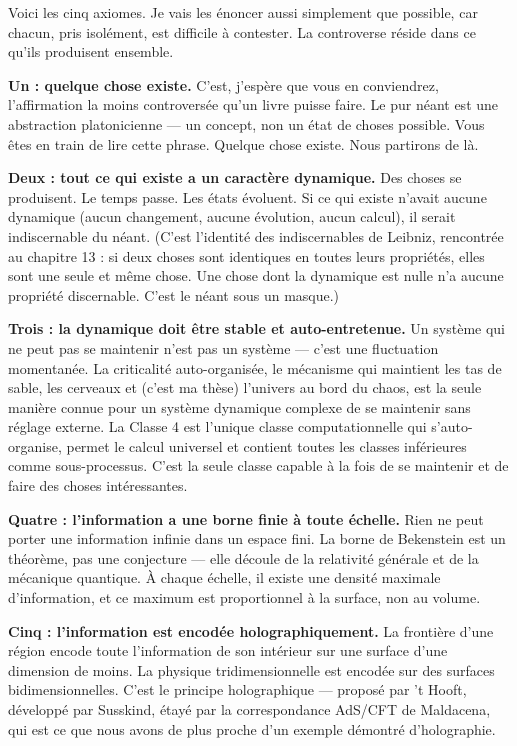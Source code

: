 \documentclass[11pt, twoside, openright]{book}
\begin{document}
Voici les cinq axiomes. Je vais les énoncer aussi simplement que possible, car chacun, pris isolément, est difficile à contester. La controverse réside dans ce qu'ils produisent ensemble.

\textbf{Un : quelque chose existe.} C'est, j'espère que vous en conviendrez, l'affirmation la moins controversée qu'un livre puisse faire. Le pur néant est une abstraction platonicienne --- un concept, non un état de choses possible. Vous êtes en train de lire cette phrase. Quelque chose existe. Nous partirons de là.

\textbf{Deux : tout ce qui existe a un caractère dynamique.} Des choses se produisent. Le temps passe. Les états évoluent. Si ce qui existe n'avait aucune dynamique (aucun changement, aucune évolution, aucun calcul), il serait indiscernable du néant. (C'est l'identité des indiscernables de Leibniz, rencontrée au chapitre 13 : si deux choses sont identiques en toutes leurs propriétés, elles sont une seule et même chose. Une chose dont la dynamique est nulle n'a aucune propriété discernable. C'est le néant sous un masque.)

\textbf{Trois : la dynamique doit être stable et auto-entretenue.} Un système qui ne peut pas se maintenir n'est pas un système --- c'est une fluctuation momentanée. La criticalité auto-organisée, le mécanisme qui maintient les tas de sable, les cerveaux et (c'est ma thèse) l'univers au bord du chaos, est la seule manière connue pour un système dynamique complexe de se maintenir sans réglage externe. La Classe 4 est l'unique classe computationnelle qui s'auto-organise, permet le calcul universel et contient toutes les classes inférieures comme sous-processus. C'est la seule classe capable à la fois de se maintenir et de faire des choses intéressantes.

\textbf{Quatre : l'information a une borne finie à toute échelle.} Rien ne peut porter une information infinie dans un espace fini. La borne de Bekenstein est un théorème, pas une conjecture --- elle découle de la relativité générale et de la mécanique quantique. À chaque échelle, il existe une densité maximale d'information, et ce maximum est proportionnel à la surface, non au volume.

\textbf{Cinq : l'information est encodée holographiquement.} La frontière d'une région encode toute l'information de son intérieur sur une surface d'une dimension de moins. La physique tridimensionnelle est encodée sur des surfaces bidimensionnelles. C'est le principe holographique --- proposé par 't Hooft, développé par Susskind, étayé par la correspondance AdS/\allowbreak{}CFT de Maldacena, qui est ce que nous avons de plus proche d'un exemple démontré d'holographie.
\end{document}
